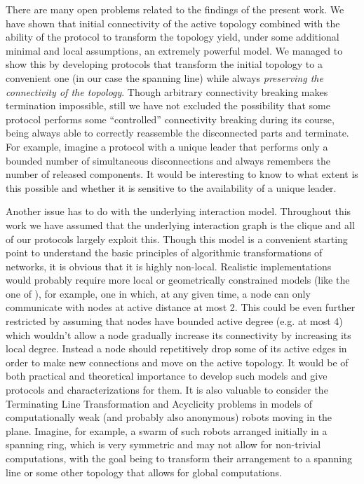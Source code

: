 \documentclass[preprint]{elsarticle}
\begin{document}
There are many open problems related to the findings of the present work. We have shown that initial connectivity of the active topology combined with the ability of the protocol to transform the topology yield, under some additional minimal and local assumptions, an extremely powerful model. We managed to show this by developing protocols that transform the initial topology to a convenient one (in our case the spanning line) while always \emph{preserving the connectivity of the topology}. Though arbitrary connectivity breaking makes termination impossible, still we have not excluded the possibility that some protocol performs some ``controlled'' connectivity breaking during its course, being always able to correctly reassemble the disconnected parts and terminate. For example, imagine a protocol with a unique leader that performs only a bounded number of simultaneous disconnections and always remembers the number of released components. It would be interesting to know to what extent is this possible and whether it is sensitive to the availability of a unique leader.

Another issue has to do with the underlying interaction model. Throughout this work we have assumed that the underlying interaction graph is the clique  and all of our protocols largely exploit this. Though this model is a convenient starting point to understand the basic principles of algorithmic transformations of networks, it is obvious that it is highly non-local. Realistic implementations would probably require more local or geometrically constrained models (like the one of \cite{Mi15}), for example, one in which, at any given time, a node can only communicate with nodes at active distance at most 2. This could be even further restricted by assuming that nodes have bounded active degree (e.g. at most 4) which wouldn't allow a node gradually increase its connectivity by increasing its local degree. Instead a node should repetitively drop some of its active edges in order to make new connections and move on the active topology. It would be of both practical and theoretical importance to develop such models and give protocols and characterizations for them. It is also valuable to consider the Terminating Line Transformation and Acyclicity problems in models of computationally weak (and probably also anonymous) robots moving in the plane. Imagine, for example, a swarm of such robots arranged initially in a spanning ring, which is very symmetric and may not allow for non-trivial computations, with the goal being to transform their arrangement to a spanning line or some other topology that allows for global computations.
\end{document}
